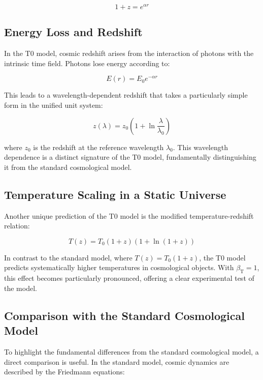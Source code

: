 \documentclass[12pt,a4paper]{article}
\newcommand{\betaT}{\beta_{\text{T}}}
\begin{document}
	\begin{equation}
		1 + z = e^{\alpha r}
	\end{equation}
	
	\subsection{Energy Loss and Redshift}
	In the T0 model, cosmic redshift arises from the interaction of photons with the intrinsic time field. Photons lose energy according to:
	
	\begin{equation}
		E(r) = E_0 e^{-\alpha r}
	\end{equation}
	
	This leads to a wavelength-dependent redshift that takes a particularly simple form in the unified unit system:
	
	\begin{equation}
		z(\lambda) = z_0 \left(1 + \ln \frac{\lambda}{\lambda_0}\right)
	\end{equation}
	
	where \(z_0\) is the redshift at the reference wavelength \(\lambda_0\). This wavelength dependence is a distinct signature of the T0 model, fundamentally distinguishing it from the standard cosmological model.
	
	\subsection{Temperature Scaling in a Static Universe}
	Another unique prediction of the T0 model is the modified temperature-redshift relation:
	
	\begin{equation}
		T(z) = T_0 (1+z)(1 + \ln(1+z))
	\end{equation}
	
	In contrast to the standard model, where \(T(z) = T_0 (1+z)\), the T0 model predicts systematically higher temperatures in cosmological objects. With \(\betaT = 1\), this effect becomes particularly pronounced, offering a clear experimental test of the model.
	
	\subsection{Comparison with the Standard Cosmological Model}
	To highlight the fundamental differences from the standard cosmological model, a direct comparison is useful. In the standard model, cosmic dynamics are described by the Friedmann equations:
	
\end{document}
